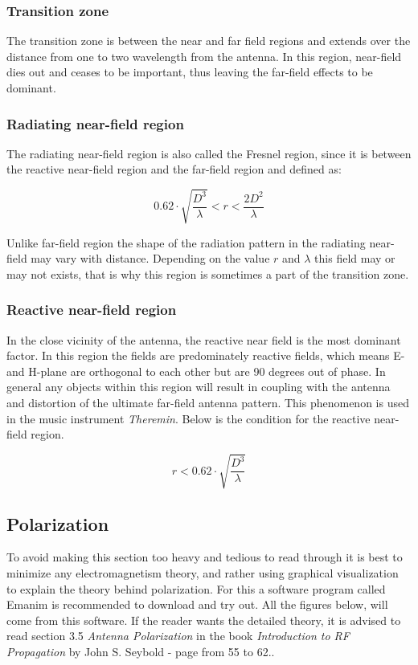\subsubsection{Transition zone}
The transition zone is between the near and far field regions and extends over the distance from one to two wavelength from the antenna. In this region, near-field dies out and ceases to be important, thus leaving the far-field effects to be dominant. 

\subsubsection{Radiating near-field region}
The radiating near-field region is also called the Fresnel region, since it is between the reactive near-field region and the far-field region and defined as:

\begin{equation}
    0.62 \cdot \sqrt{\frac{D^3}{\lambda}} < r < \frac{2D^2}{\lambda}
\end{equation}

Unlike far-field region the shape of the radiation pattern in the radiating near-field may vary with distance. Depending on the value $r$ and $\lambda$ this field may or may not exists, that is why this region is sometimes a part of the transition zone.   

\subsubsection{Reactive near-field region}
In the close vicinity of the antenna, the reactive near field is the most dominant factor. In this region the fields are predominately reactive fields, which means E- and H-plane are orthogonal to each other but are 90 degrees out of phase. In general any objects within this region will result in coupling with the antenna and distortion of the ultimate far-field antenna pattern. This phenomenon is used in the music instrument \textit{Theremin}\cite{Theremin}. Below is the condition for the reactive near-field region.

\begin{equation}
   r < 0.62 \cdot \sqrt{\frac{D^3}{\lambda}}
\end{equation}

\subsection{Polarization}
To avoid making this section too heavy and tedious to read through it is best to minimize any electromagnetism theory, and rather using graphical visualization to explain the theory behind polarization. For this a software program called Emanim\cite{EMANIM} is recommended to download and try out. All the figures below, will come from this software. If the reader wants the detailed theory, it is advised to read section 3.5 \textit{Antenna Polarization} in the book \textit{Introduction to RF Propagation} by John S. Seybold - page from 55 to 62.\cite{RFpropagation}.

